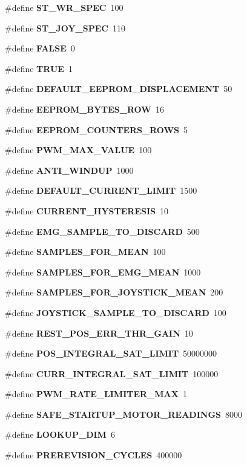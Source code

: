 \begin{DoxyCompactItemize}
\#define {\bfseries S\+T\+\_\+\+W\+R\+\_\+\+S\+P\+EC}~100
\item 
\mbox{\label{globals_8h_ae485f34b39604cd4ae1d475911e68aaa}} 
\#define {\bfseries S\+T\+\_\+\+J\+O\+Y\+\_\+\+S\+P\+EC}~110
\item 
\mbox{\label{globals_8h_aa93f0eb578d23995850d61f7d61c55c1}} 
\#define {\bfseries F\+A\+L\+SE}~0
\item 
\mbox{\label{globals_8h_aa8cecfc5c5c054d2875c03e77b7be15d}} 
\#define {\bfseries T\+R\+UE}~1
\item 
\#define \textbf{ D\+E\+F\+A\+U\+L\+T\+\_\+\+E\+E\+P\+R\+O\+M\+\_\+\+D\+I\+S\+P\+L\+A\+C\+E\+M\+E\+NT}~50
\item 
\#define \textbf{ E\+E\+P\+R\+O\+M\+\_\+\+B\+Y\+T\+E\+S\+\_\+\+R\+OW}~16
\item 
\#define \textbf{ E\+E\+P\+R\+O\+M\+\_\+\+C\+O\+U\+N\+T\+E\+R\+S\+\_\+\+R\+O\+WS}~5
\item 
\#define \textbf{ P\+W\+M\+\_\+\+M\+A\+X\+\_\+\+V\+A\+L\+UE}~100
\item 
\#define \textbf{ A\+N\+T\+I\+\_\+\+W\+I\+N\+D\+UP}~1000
\item 
\#define \textbf{ D\+E\+F\+A\+U\+L\+T\+\_\+\+C\+U\+R\+R\+E\+N\+T\+\_\+\+L\+I\+M\+IT}~1500
\item 
\#define \textbf{ C\+U\+R\+R\+E\+N\+T\+\_\+\+H\+Y\+S\+T\+E\+R\+E\+S\+IS}~10
\item 
\#define \textbf{ E\+M\+G\+\_\+\+S\+A\+M\+P\+L\+E\+\_\+\+T\+O\+\_\+\+D\+I\+S\+C\+A\+RD}~500
\item 
\#define \textbf{ S\+A\+M\+P\+L\+E\+S\+\_\+\+F\+O\+R\+\_\+\+M\+E\+AN}~100
\item 
\#define \textbf{ S\+A\+M\+P\+L\+E\+S\+\_\+\+F\+O\+R\+\_\+\+E\+M\+G\+\_\+\+M\+E\+AN}~1000
\item 
\#define \textbf{ S\+A\+M\+P\+L\+E\+S\+\_\+\+F\+O\+R\+\_\+\+J\+O\+Y\+S\+T\+I\+C\+K\+\_\+\+M\+E\+AN}~200
\item 
\#define \textbf{ J\+O\+Y\+S\+T\+I\+C\+K\+\_\+\+S\+A\+M\+P\+L\+E\+\_\+\+T\+O\+\_\+\+D\+I\+S\+C\+A\+RD}~100
\item 
\#define \textbf{ R\+E\+S\+T\+\_\+\+P\+O\+S\+\_\+\+E\+R\+R\+\_\+\+T\+H\+R\+\_\+\+G\+A\+IN}~10
\item 
\#define \textbf{ P\+O\+S\+\_\+\+I\+N\+T\+E\+G\+R\+A\+L\+\_\+\+S\+A\+T\+\_\+\+L\+I\+M\+IT}~50000000
\item 
\#define \textbf{ C\+U\+R\+R\+\_\+\+I\+N\+T\+E\+G\+R\+A\+L\+\_\+\+S\+A\+T\+\_\+\+L\+I\+M\+IT}~100000
\item 
\mbox{\label{globals_8h_adf1a94447aeafa5087c7190375b7ccd9}} 
\#define {\bfseries P\+W\+M\+\_\+\+R\+A\+T\+E\+\_\+\+L\+I\+M\+I\+T\+E\+R\+\_\+\+M\+AX}~1
\item 
\#define \textbf{ S\+A\+F\+E\+\_\+\+S\+T\+A\+R\+T\+U\+P\+\_\+\+M\+O\+T\+O\+R\+\_\+\+R\+E\+A\+D\+I\+N\+GS}~8000
\item 
\#define \textbf{ L\+O\+O\+K\+U\+P\+\_\+\+D\+IM}~6
\item 
\#define \textbf{ P\+R\+E\+R\+E\+V\+I\+S\+I\+O\+N\+\_\+\+C\+Y\+C\+L\+ES}~400000
\end{DoxyCompactItemize}

